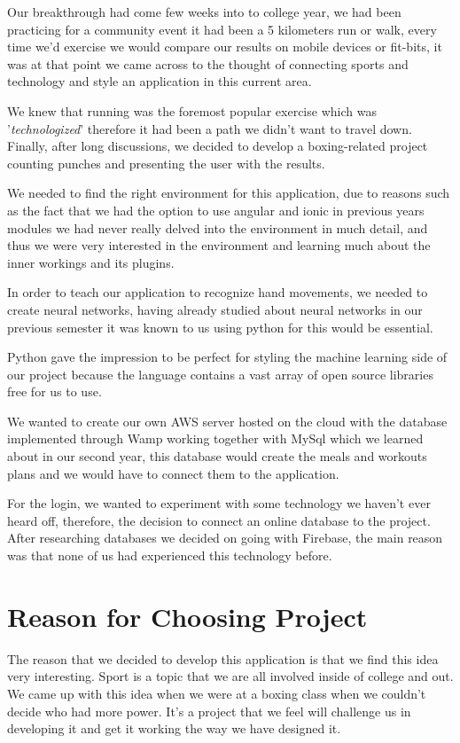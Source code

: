 \documentclass[a4paper,12pt]{report}
\begin{document}
Our breakthrough had come few weeks into to college year, we had been practicing for a community event it had been a 5 kilometers run or walk, every time we'd exercise we would compare our results on mobile devices or fit-bits, it was at that point we came across to the thought of connecting sports and technology and style an application in this current area. 

We knew that running was the foremost popular exercise which was '\textit{technologized}' therefore it had been a path we didn't want to travel down. Finally, after long discussions, we decided to develop a boxing-related project counting punches and presenting the user with the results.

We needed to find the right environment for this application, due to reasons such as the fact that we had the option to use angular and ionic in previous years modules we had never really delved into the environment in much detail, and thus we were very interested in the environment and learning much about the inner workings and its plugins.

In order to teach our application to recognize hand movements, we needed to create neural networks, having already studied about neural networks in our previous semester it was known to us using python for this would be essential.

Python gave the impression to be perfect for styling the machine learning side of our project because the language contains a vast array of open source libraries free for us to use.

We wanted to create our own AWS server hosted on the cloud with the database implemented through Wamp working together with MySql which we learned about in our second year, this database would create the meals and workouts plans and we would have to connect them to the application.

For the login, we wanted to experiment with some technology we haven't ever heard off, therefore, the decision to connect an online database to the project. After researching databases we decided on going with Firebase, the main reason was that none of us had experienced this technology before.

\section{Reason for Choosing Project}
The reason that we decided to develop this application is that we find this idea very interesting. Sport is a topic that we are all involved inside of college and out. We came up with this idea when we were at a boxing class when we couldn't decide who had more power. It’s a project that we feel will challenge us in developing it and get it working the way we have designed it.
\end{document}
